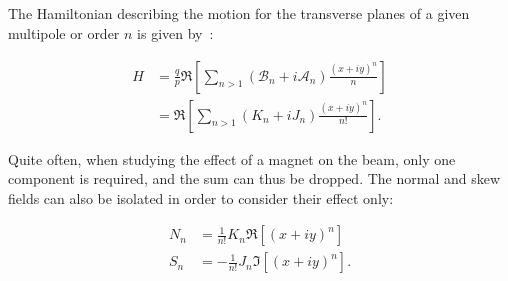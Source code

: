 \subsection{}

The Hamiltonian describing the motion for the transverse planes of a given multipole or order $n$ is
given by~\cite{keintzel_jacqueline_beam_nodate,tomas_direct_2003,franchi_studies_2006}:

\begin{equation}
    \begin{aligned}
        H &= \frac{q}{p} \Re \left[ \sum_{n>1} (\mathcal{B}_n + i\mathcal{A}_n) \frac{(x+iy)^n}{n} \right] \\
          &= \Re \left[ \sum_{n>1} (K_n + iJ_n) \frac{(x+iy)^n}{n!} \right].
    \end{aligned}
    \label{eq:hamiltonian_magnet}
\end{equation}

Quite often, when studying the effect of a magnet on the beam, only one component is required, and
the sum can thus be dropped.
The normal and skew fields can also be isolated in order to consider their effect only:

\begin{equation}
    \begin{aligned}
        N_n &= \frac{1}{n!} K_n \Re \left[ (x+iy)^n \right] \\
        S_n &= -\frac{1}{n!} J_n \Im \left[ (x+iy)^n \right].
    \end{aligned}
    \label{eq:normal_skew_hamiltonian_magnet}
\end{equation}



